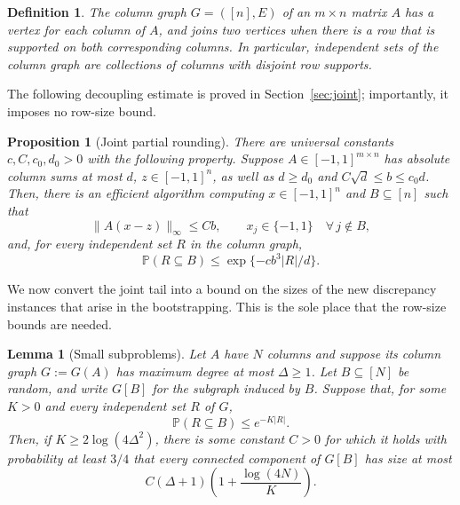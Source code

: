 \documentclass[10pt,a4paper]{amsart}
\newtheorem{proposition}[theorem]{Proposition}
\newtheorem{lemma}[theorem]{Lemma}
\newtheorem{definition}[theorem]{Definition}
\newcommand{\Prob}{\mathbb P}
\newcommand{\norm}[1]{\lVert#1\rVert}
\begin{document}
\begin{definition}\label{def:columngraph}
The \emph{column graph} $G = ([n],E)$ of an $m\times n$ matrix $A$ has a vertex for each column of $A$, and joins two vertices when there is a row that is supported on both corresponding columns. In particular, independent sets of the column graph are collections of columns with disjoint row supports.
\end{definition}


The following decoupling estimate is proved in Section~\ref{sec:joint}; importantly, it imposes no row-size bound.

\begin{proposition}[Joint partial rounding]\label{prop:partial}
There are universal constants $c,C,c_0,d_0>0$ with the following property. Suppose $A\in[-1,1]^{m\times n}$ has absolute column sums at most $d$, $z\in[-1,1]^n$, as well as $d\ge d_0$ and $C\sqrt d\le b\le c_0d$. Then, there is an efficient algorithm computing $x\in[-1,1]^n$ and $B\subseteq[n]$ such that
\begin{equation}\label{eq:partial-error} \norm{A(x-z)}_\infty\le Cb, \qquad x_j\in\{-1,1\} \quad \forall\, j\notin B, \end{equation}
and, for every independent set $R$ in the column graph,
\begin{equation}\label{eq:joint-tail} \Prob(R\subseteq B)\le\exp\{-cb^3|R|/d\}. \end{equation}
\end{proposition}

We now convert the joint tail into a bound on the sizes of the new discrepancy instances that arise in the bootstrapping. This is the sole place that the row-size bounds are needed.

\begin{lemma}[Small subproblems]\label{lem:components}
Let $A$ have $N$ columns and suppose its column graph $G:=G(A)$ has maximum degree at most $\Delta\ge1$. Let $B\subseteq[N]$ be random, and write $G[B]$ for the subgraph induced by $B$. Suppose that, for some $K>0$ and every independent set $R$ of $G$,
\[ \Prob(R\subseteq B)\le e^{-K|R|}. \]
Then, if $K\ge2\log(4\Delta^2)$, there is some constant $C>0$ for which it holds with probability at least $3/4$ that every connected component of $G[B]$ has size at most
\begin{equation}\label{eq:component-size} C(\Delta+1)\left(1+\frac{\log(4N)}K\right). \end{equation}
\end{lemma}
\end{document}
